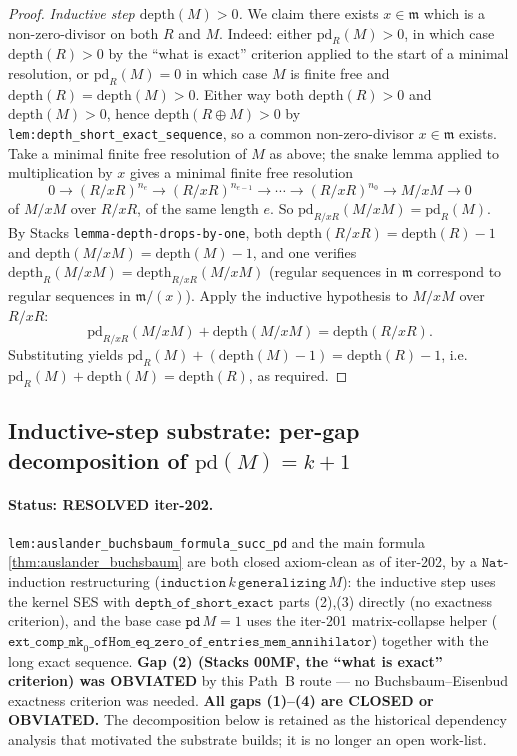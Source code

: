 \begin{proof}
  \emph{Inductive step \(\text{depth}(M) > 0\).} We claim there exists \(x \in \mathfrak{m}\)
  which is a non-zero-divisor on both \(R\) and \(M\). Indeed: either \(\text{pd}_R(M) > 0\), in
  which case \(\text{depth}(R) > 0\) by the ``what is exact'' criterion applied to the start
  of a minimal resolution, or \(\text{pd}_R(M) = 0\) in which case \(M\) is finite free and
  \(\text{depth}(R) = \text{depth}(M) > 0\). Either way both \(\text{depth}(R) > 0\) and
  \(\text{depth}(M) > 0\), hence \(\text{depth}(R \oplus M) > 0\) by
  \texttt{lem:depth_short_exact_sequence}, so a common non-zero-divisor \(x \in
  \mathfrak{m}\) exists. Take a minimal finite free resolution of \(M\) as above; the snake
  lemma applied to multiplication by \(x\) gives a minimal finite free resolution
  \[
    0 \to (R/xR)^{n_e} \to (R/xR)^{n_{e-1}} \to \cdots \to (R/xR)^{n_0} \to M/xM \to 0
  \]
  of \(M/xM\) over \(R/xR\), of the same length \(e\). So
  \(\text{pd}_{R/xR}(M/xM) = \text{pd}_R(M)\). By Stacks
  \texttt{lemma-depth-drops-by-one}, both \(\text{depth}(R/xR) = \text{depth}(R) - 1\) and
  \(\text{depth}(M/xM) = \text{depth}(M) - 1\), and one verifies
  \(\text{depth}_R(M/xM) = \text{depth}_{R/xR}(M/xM)\) (regular sequences in \(\mathfrak{m}\)
  correspond to regular sequences in \(\mathfrak{m}/(x)\)). Apply the inductive hypothesis to
  \(M/xM\) over \(R/xR\):
  \[
    \text{pd}_{R/xR}(M/xM) + \text{depth}(M/xM) = \text{depth}(R/xR).
  \]
  Substituting yields
  \(\text{pd}_R(M) + (\text{depth}(M) - 1) = \text{depth}(R) - 1\), i.e.\
  \(\text{pd}_R(M) + \text{depth}(M) = \text{depth}(R)\), as required.
\end{proof}


\subsection{Inductive-step substrate: per-gap decomposition of
  \texorpdfstring{\(\text{pd}(M) = k+1\)}{pd(M) = k+1}}
\label{subsec:succ_pd_gap_sequence}

\paragraph{Status: RESOLVED iter-202.}
\texttt{lem:auslander_buchsbaum_formula_succ_pd} and the main formula
\cref{thm:auslander_buchsbaum} are both closed axiom-clean as of
iter-202, by a \(\texttt{Nat}\)-induction restructuring
(\(\texttt{induction}\,k\,\texttt{generalizing}\,M\)): the inductive
step uses the kernel SES with
\(\texttt{depth\_of\_short\_exact}\) parts (2),(3) directly (no
exactness criterion), and the base case \(\texttt{pd}\,M = 1\) uses
the iter-201 matrix-collapse helper
(\(\texttt{ext\_comp\_mk}_0\texttt{\_ofHom\_eq\_zero\_of\_entries\_mem\_annihilator}\))
together with the long exact sequence. \textbf{Gap (2) (Stacks 00MF,
the ``what is exact'' criterion) was OBVIATED} by this Path~B route ---
no Buchsbaum--Eisenbud exactness criterion was needed. \textbf{All
gaps (1)--(4) are CLOSED or OBVIATED.} The decomposition below is
retained as the historical dependency analysis that motivated the
substrate builds; it is no longer an open work-list.

